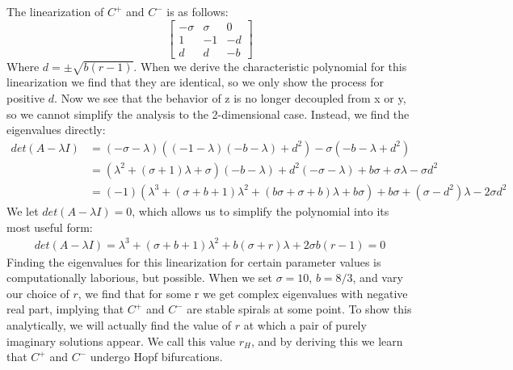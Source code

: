 \documentclass{report}
\begin{document}
The linearization of \(C^+\) and \(C^-\) is as follows:
\[
\begin{bmatrix}
   -\sigma & \sigma & 0 \\
   1 & -1 & -d \\
   d & d & -b
\end{bmatrix}
\]
Where \(d = \pm \sqrt{b(r-1)}\). When we derive the characteristic polynomial 
for this linearization we find that they are identical, so we only show the
process for positive \(d\). Now we see that the behavior of z is no longer
decoupled from x or y, so we cannot simplify the analysis to the 2-dimensional
case. Instead, we find the eigenvalues directly:
\begin{align*}
  det(A-\lambda I) &= (-\sigma-\lambda)((-1-\lambda)(-b-\lambda)+d^2 )-
  \sigma(-b-\lambda+d^2) \\
  \quad &= (\lambda^2 +(\sigma+1)\lambda+\sigma)(-b-\lambda)+
d^2(-\sigma-\lambda)+b\sigma+\sigma\lambda-\sigma d^2 \\
  \quad &= (-1)(\lambda^3 +(\sigma + b + 1)\lambda^2 +(b\sigma+\sigma+b)\lambda
+b\sigma)+b\sigma+(\sigma-d^2)\lambda-2\sigma d^2
\end{align*}
We let \(det(A-\lambda I) = 0\), which allows us to simplify the polynomial
into its most useful form:
\begin{align*}
  det(A-\lambda I) = \lambda^3 + (\sigma+b+1)\lambda^2 + b(\sigma+r)\lambda
+ 2\sigma b(r-1) = 0
\end{align*}
Finding the eigenvalues for this linearization for certain parameter values
is computationally laborious, but possible. When we set \(\sigma = 10\),
\(b=8/3\), and vary our choice of \(r\), we find that for some r we get
complex eigenvalues with negative real part, implying that \(C^+\) and \(C^-\)
are stable spirals at some point. To show this analytically, we will actually
find the value of \(r\) at which a pair of purely imaginary solutions appear.
We call this value \(r_H\), and by deriving this we learn that \(C^+\) and
\(C^-\) undergo Hopf bifurcations. 
\end{document}
